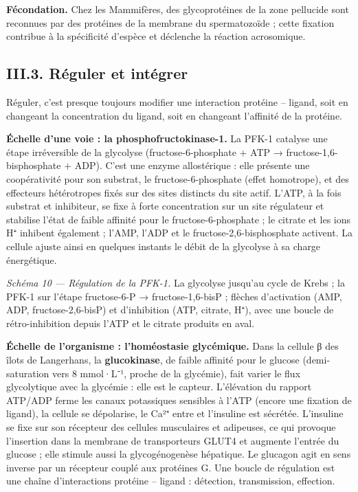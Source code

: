 \documentclass[11pt,a4paper]{article}
\begin{document}
\textbf{Fécondation.} Chez les Mammifères, des glycoprotéines de la zone pellucide sont reconnues par des protéines de la membrane du spermatozoïde ; cette fixation contribue à la spécificité d'espèce et déclenche la réaction acrosomique.

\hypertarget{iii.3.-ruxe9guler-et-intuxe9grer}{%
\subsection{III.3. Réguler et intégrer}\label{iii.3.-ruxe9guler-et-intuxe9grer}}

Réguler, c'est presque toujours modifier une interaction protéine -- ligand, soit en changeant la concentration du ligand, soit en changeant l'affinité de la protéine.

\textbf{Échelle d'une voie : la phosphofructokinase-1.} La PFK-1 catalyse une étape irréversible de la glycolyse (fructose-6-phosphate + ATP → fructose-\allowbreak{}1,6-\allowbreak{}bisphosphate + ADP). C'est une enzyme allostérique : elle présente une coopérativité pour son substrat, le fructose-6-phosphate (effet homotrope), et des effecteurs hétérotropes fixés sur des sites distincts du site actif. L'ATP, à la fois substrat et inhibiteur, se fixe à forte concentration sur un site régulateur et stabilise l'état de faible affinité pour le fructose-6-phosphate ; le citrate et les ions H⁺ inhibent également ; l'AMP, l'ADP et le fructose-\allowbreak{}2,6-\allowbreak{}bisphosphate activent. La cellule ajuste ainsi en quelques instants le débit de la glycolyse à sa charge énergétique.

\emph{Schéma 10 --- Régulation de la PFK-1.} La glycolyse jusqu'au cycle de Krebs ; la PFK-1 sur l'étape fructose-6-P → fructose-1,6-bisP ; flèches d'activation (AMP, ADP, fructose-2,6-bisP) et d'inhibition (ATP, citrate, H⁺), avec une boucle de rétro-inhibition depuis l'ATP et le citrate produits en aval.

\textbf{Échelle de l'organisme : l'homéostasie glycémique.} Dans la cellule β des îlots de Langerhans, la \textbf{glucokinase}, de faible affinité pour le glucose (demi-saturation vers 8 mmol·L⁻¹, proche de la glycémie), fait varier le flux glycolytique avec la glycémie : elle est le capteur. L'élévation du rapport ATP/ADP ferme les canaux potassiques sensibles à l'ATP (encore une fixation de ligand), la cellule se dépolarise, le Ca²⁺ entre et l'insuline est sécrétée. L'insuline se fixe sur son récepteur des cellules musculaires et adipeuses, ce qui provoque l'insertion dans la membrane de transporteurs GLUT4 et augmente l'entrée du glucose ; elle stimule aussi la glycogénogenèse hépatique. Le glucagon agit en sens inverse par un récepteur couplé aux protéines G. Une boucle de régulation est une chaîne d'interactions protéine -- ligand : détection, transmission, effection.
\end{document}
